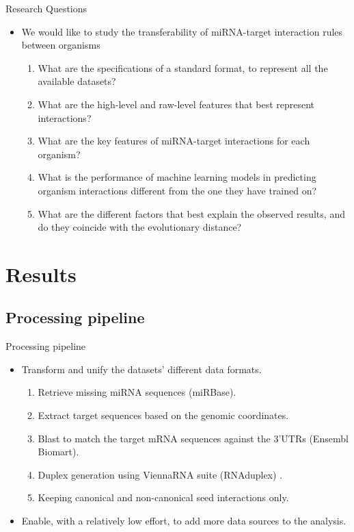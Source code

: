 \documentclass{beamer}
\begin{document}
\begin{frame}{Research Questions}
	\begin{itemize}

\item We would like to study the transferability of miRNA-target interaction rules between organisms
\begin{enumerate}
\item What are the specifications of a standard format, to represent all the available datasets?
\item What are the high-level and raw-level features that best represent interactions?
\item What are the key features of miRNA-target interactions for each organism?
\item What is the performance of machine learning models in predicting organism interactions different from the one they have trained on?
\item What are the different factors that best explain the observed results, and do they coincide with the evolutionary distance?
\end{enumerate}

	\end{itemize}
\end{frame}



\section{Results}
\subsection{Processing pipeline}
\begin{frame}{Processing pipeline}
\begin{itemize}
\item Transform and unify the datasets' different data formats.
\begin{enumerate}
\item Retrieve missing miRNA sequences (miRBase).
\item Extract target sequences based on the genomic coordinates. 
\item Blast \cite{altschul1990basic_blast} to match the target mRNA sequences against the 3'UTRs (Ensembl Biomart).
\item Duplex generation using ViennaRNA suite (RNAduplex) \cite{lorenz2011viennarna}.
\item Keeping canonical and non-canonical seed interactions only.
\end{enumerate}
\item Enable, with a relatively low effort, to add more data sources to the analysis.
\end{itemize}
 \end{frame}
\end{document}
